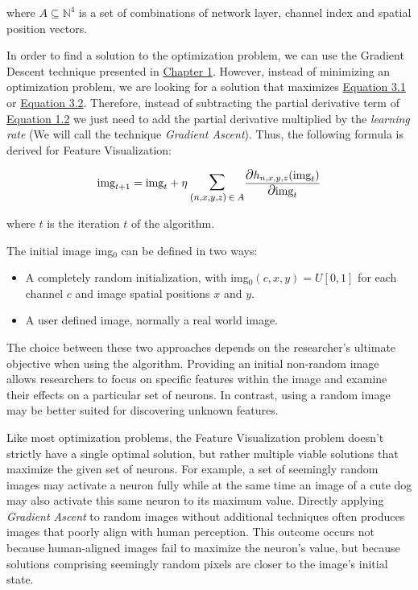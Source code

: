 where \(A \subseteq \mathbb{N}^4\) is a set of combinations of network layer, channel index and spatial position vectors.

In order to find a solution to the optimization problem, we can use the Gradient Descent technique presented in \hyperref[sec:gradient_descent]{Chapter 1}.
However, instead of minimizing an optimization problem, we are looking for a solution that maximizes \hyperref[eq:feat_vis_optimization]{Equation 3.1} or \hyperref[eq:feat_vis_optimization_multivar]{Equation 3.2}.
Therefore, instead of subtracting the partial derivative term of \hyperref[eq:gradient_descent]{Equation 1.2} we just need to add the partial derivative multiplied by the \emph{learning rate} (We will call the technique \emph{Gradient Ascent}). 
Thus, the following formula is derived for Feature Visualization:

\begin{equation}
    \text{img}_{t + 1} = \text{img}_t + \eta \: \mathlarger{\mathlarger{\sum}}_{(n, x, y, z) \: \in \: A} \frac{\mathlarger{\mathlarger{\partial}} h_{n, x, y, z} (\text{img}_t)}{\mathlarger{\mathlarger{\partial}} \text{img}_t}
    \label{eq:feat_vis_formula}
\end{equation}

\noindent where \(t\) is the iteration \(t\) of the algorithm. 

The initial image img\(_0\) can be defined in two ways:

\begin{itemize}
    \item A completely random initialization, with img\(_0(c, x, y) = U[0, 1]\) for each channel \(c\) and image spatial positions \(x\) and \(y\).
    \item A user defined image, normally a real world image.
\end{itemize}

The choice between these two approaches depends on the researcher's ultimate objective when using the algorithm.
Providing an initial non-random image allows researchers to focus on specific features within the image and examine their effects on a particular set of neurons. 
In contrast, using a random image may be better suited for discovering unknown features.

Like most optimization problems, the Feature Visualization problem doesn't strictly have a single optimal solution, but rather multiple viable solutions that maximize the given set of neurons.
For example, a set of seemingly random images may activate a neuron fully while at the same time an image of a cute dog may also activate this same neuron to its maximum value.
Directly applying \emph{Gradient Ascent} to random images without additional techniques often produces images that poorly align with human perception. This outcome occurs not because human-aligned images fail to maximize the neuron's value, but because solutions comprising seemingly random pixels are closer to the image's initial state.

